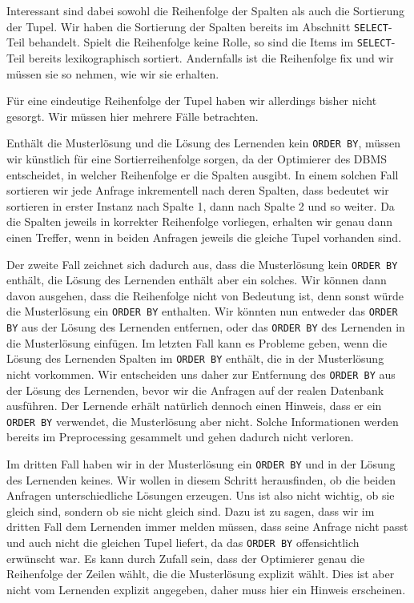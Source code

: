Interessant sind dabei sowohl die Reihenfolge der Spalten als auch die Sortierung der Tupel. Wir haben die Sortierung der Spalten bereits im Abschnitt \verb|SELECT|-Teil behandelt. Spielt die Reihenfolge keine Rolle, so sind die Items im \verb|SELECT|-Teil bereits lexikographisch sortiert. Andernfalls ist die Reihenfolge fix und wir müssen sie so nehmen, wie wir sie erhalten.

Für eine eindeutige Reihenfolge der Tupel haben wir allerdings bisher nicht gesorgt. Wir müssen hier mehrere Fälle betrachten. 

Enthält die Musterlösung und die Lösung des Lernenden kein \verb|ORDER BY|, müssen wir künstlich für eine Sortierreihenfolge sorgen, da der Optimierer des DBMS entscheidet, in welcher Reihenfolge er die Spalten ausgibt. In einem solchen Fall sortieren wir jede Anfrage inkrementell nach deren Spalten, dass bedeutet wir sortieren in erster Instanz nach Spalte 1, dann nach Spalte 2 und so weiter. Da die Spalten jeweils in korrekter Reihenfolge vorliegen, erhalten wir genau dann einen Treffer, wenn in beiden Anfragen jeweils die gleiche Tupel vorhanden sind.

Der zweite Fall zeichnet sich dadurch aus, dass die Musterlösung kein \verb|ORDER BY| enthält, die Lösung des Lernenden enthält aber ein solches. Wir können dann davon ausgehen, dass die Reihenfolge nicht von Bedeutung ist, denn sonst würde die Musterlösung ein \verb|ORDER BY| enthalten. Wir könnten nun entweder das \verb|ORDER BY| aus der Lösung des Lernenden entfernen, oder das \verb|ORDER BY| des Lernenden in die Musterlösung einfügen. Im letzten Fall kann es Probleme geben, wenn die Lösung des Lernenden Spalten im \verb|ORDER BY| enthält, die in der Musterlösung nicht vorkommen. Wir entscheiden uns daher zur Entfernung des \verb|ORDER BY| aus der Lösung des Lernenden, bevor wir die Anfragen auf der realen Datenbank ausführen. Der Lernende erhält natürlich dennoch einen Hinweis, dass er ein \verb|ORDER BY| verwendet, die Musterlösung aber nicht. Solche Informationen werden bereits im Preprocessing gesammelt und gehen dadurch nicht verloren.

Im dritten Fall haben wir in der Musterlösung ein \verb|ORDER BY| und in der Lösung des Lernenden keines. Wir wollen in diesem Schritt herausfinden, ob die beiden Anfragen unterschiedliche Lösungen erzeugen. Uns ist also nicht wichtig, ob sie gleich sind, sondern ob sie nicht gleich sind. Dazu ist zu sagen, dass wir im dritten Fall dem Lernenden immer melden müssen, dass seine Anfrage nicht passt und auch nicht die gleichen Tupel liefert, da das \verb|ORDER BY| offensichtlich erwünscht war. Es kann durch Zufall sein, dass der Optimierer genau die Reihenfolge der Zeilen wählt, die die Musterlösung explizit wählt. Dies ist aber nicht vom Lernenden explizit angegeben, daher muss hier ein Hinweis erscheinen.

